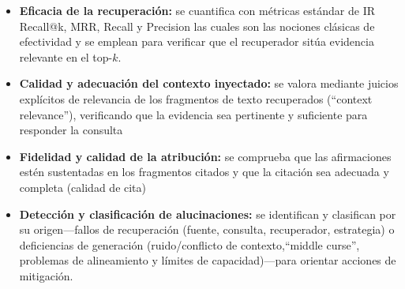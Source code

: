 \begin{itemize}
    \item \textbf{Eficacia de la recuperación:} se cuantifica con métricas estándar de IR Recall@k,
    MRR, Recall y Precision las cuales son las nociones clásicas de efectividad y se emplean para
    verificar que el recuperador sitúa evidencia relevante en el top-$k$.

    \item \textbf{Calidad y adecuación del contexto inyectado:} se valora mediante juicios explícitos de relevancia
    de los fragmentos de texto recuperados (“context relevance”), verificando que la evidencia sea pertinente y suficiente
    para responder la consulta

    \item \textbf{Fidelidad y calidad de la atribución:} se comprueba que las afirmaciones estén sustentadas en los
    fragmentos citados y que la citación sea adecuada y completa (calidad de cita)

    \item \textbf{Detección y clasificación de alucinaciones:} se identifican y clasifican por su origen—fallos de
    recuperación (fuente, consulta, recuperador, estrategia) o deficiencias de generación (ruido/conflicto de
    contexto,“middle curse”, problemas de alineamiento y límites de capacidad)—para orientar acciones de mitigación.
\end{itemize}


